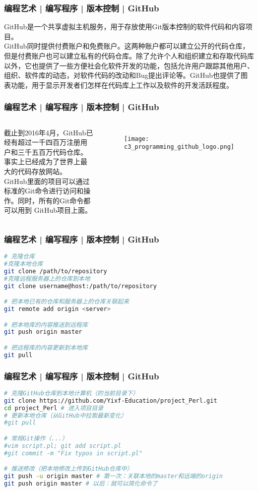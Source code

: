 \begin{frame}
  \frametitle{编程艺术 | 编写程序 | 版本控制 | \alert{GitHub}}
  GitHub是一个共享虚拟主机服务，用于\alert{存放使用Git版本控制的软件代码和内容项目}。\\
  \vspace{1em}
GitHub同时提供付费账户和免费账户。这两种账户都可以建立公开的代码仓库，但是付费账户也可以建立私有的代码仓库。除了允许个人和组织建立和存取代码库以外，它也提供了一些方便社会化软件开发的功能，包括允许用户跟踪其他用户、组织、软件库的动态，对软件代码的改动和Bug提出评论等。GitHub也提供了图表功能，用于显示开发者们怎样在代码库上工作以及软件的开发活跃程度。\\
\end{frame}

\begin{frame}
  \frametitle{编程艺术 | 编写程序 | 版本控制 | \alert{GitHub}}
  \begin{columns}
截止到2016年4月，GitHub已经有超过一千四百万注册用户和三千五百万代码仓库。事实上已经成为了\alert{世界上最大的代码存放网站}。\\
  \vspace{1em}
  GitHub里面的项目可以通过标准的Git命令进行访问和操作。同时，所有的Git命令都可以用到 GitHub项目上面。
    \begin{figure}
      \centering
      \texttt{[image: c3\_programming\_github\_logo.png]}
    \end{figure}
\end{columns}
\end{frame}

\begin{frame}[fragile]
  \frametitle{编程艺术 | 编写程序 | 版本控制 | \alert{GitHub}}
\begin{lstlisting}[language=sh]
# 克隆仓库
#克隆本地仓库
git clone /path/to/repository
#克隆远程服务器上的仓库到本地
git clone username@host:/path/to/repository

# 把本地已有的仓库和服务器上的仓库关联起来
git remote add origin <server>

# 把本地库的内容推送到远程库
git push origin master

# 把远程库的内容更新到本地库
git pull
\end{lstlisting}
\end{frame}

\begin{frame}[fragile]
  \frametitle{编程艺术 | 编写程序 | 版本控制 | GitHub}
\begin{lstlisting}[language=sh]
# 克隆GitHub仓库到本地计算机（的当前目录下）
git clone https://github.com/Yixf-Education/project_Perl.git
cd project_Perl # 进入项目目录
# 更新本地仓库（从GitHub中拉取最新变化）
#git pull

# 常规Git操作（...）
#vim script.pl; git add script.pl
#git commit -m "Fix typos in script.pl" 

# 推送修改（把本地修改上传到GitHub仓库中）
git push -u origin master # 第一次：关联本地的master和远端的origin
git push origin master # 以后：就可以简化命令了
\end{lstlisting}
\end{frame}

